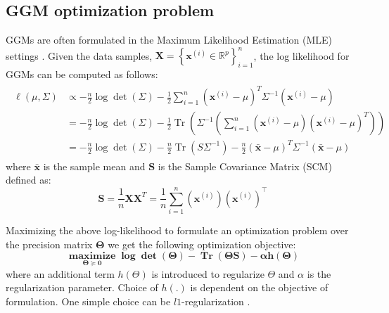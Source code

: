 \subsection{GGM optimization problem} 
GGMs are often formulated in the Maximum Likelihood Estimation (MLE) settings \citep{uhler2017gaussian}. Given the data samples, $\mathbf{X}=\left\{\mathbf{x}^{(i)} \in \mathbb{R}^{p}\right\}_{i=1}^{n}$, the log likelihood for GGMs can be computed as follows:
\begin{eqnarray}
	\begin{aligned}
		\ell(\mu, \Sigma) & \propto-\frac{n}{2} \log \operatorname{det}(\Sigma)-\frac{1}{2} \sum_{i=1}^{n}\left(\mathbf{x}^{(i)}-\mu\right)^{T} \Sigma^{-1}\left(\mathbf{x}^{(i)}-\mu\right) \\
		&=-\frac{n}{2} \log \operatorname{det}(\Sigma)-\frac{1}{2} \operatorname{Tr}\left(\Sigma^{-1}\left(\sum_{i=1}^{n}\left(\mathbf{x}^{(i)}-\mu\right)\left(\mathbf{x}^{(i)}-\mu\right)^{T}\right)\right) \\
		&=-\frac{n}{2} \log \operatorname{det}(\Sigma)-\frac{n}{2} \operatorname{Tr}\left(S \Sigma^{-1}\right)-\frac{n}{2}(\bar{\mathbf{x}}-\mu)^{T} \Sigma^{-1}(\bar{\mathbf{x}}-\mu)
	\end{aligned}
\end{eqnarray}
where $\bar{\mathbf{x}}$ is the sample mean and $\mathbf{S}$ is the Sample Covariance Matrix (SCM) defined as: 
$$
\mathbf{S}= \frac{1}{n} \mathbf{X}\mathbf{X}^T =\frac{1}{n} \sum_{i=1}^{n}\left(\mathbf{x}^{(i)}\right)\left(\mathbf{x}^{(i)}\right)^{\top}
$$

Maximizing the above log-likelihood to formulate an optimization problem over the precision matrix $\mathbf{\Theta}$ we get the following optimization objective:
\begin{equation}
\mathbf{	\underset{\Theta \succeq 0}{\operatorname{maximize}} \log \operatorname{det}(\Theta)-\operatorname{Tr}(\Theta S)-\alpha h(\Theta)}
\end{equation}
where an additional term $h(\Theta)$ is introduced to regularize $\Theta$ and $\alpha$ is the regularization parameter. Choice of $h(.)$ is dependent on the objective of formulation. One simple choice can be $l1$-regularization \citep{friedman2008sparse}.
